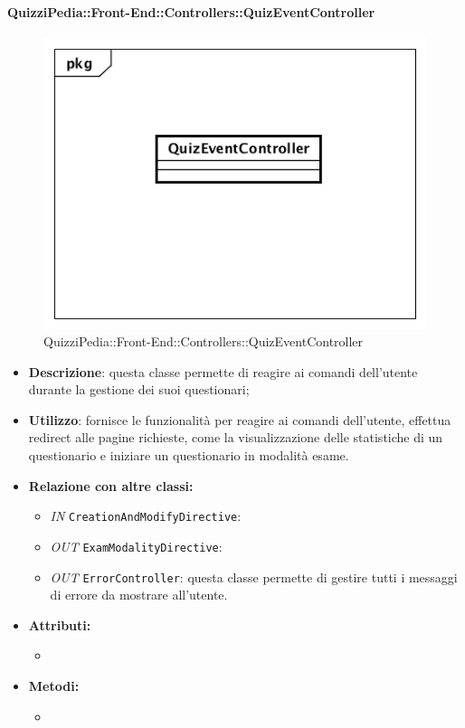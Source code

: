 \paragraph{QuizziPedia::Front-End::Controllers::QuizEventController}
\begin{figure}
	\centering
	\includegraphics[scale=0.45]{UML/Classi/Front-End/QuizziPedia_Front-end_Controller_QuizEventController.png}
	\caption{QuizziPedia::Front-End::Controllers::QuizEventController}
\end{figure}
\begin{itemize}
	\item \textbf{Descrizione}: questa classe permette di reagire ai comandi dell'utente durante la gestione dei suoi questionari;
	\item \textbf{Utilizzo}: fornisce le funzionalità per reagire ai comandi dell'utente, effettua redirect alle pagine richieste, come la visualizzazione delle statistiche di un questionario e iniziare un questionario in modalità esame.
	\item \textbf{Relazione con altre classi:}
	\begin{itemize}
		\item \textit{IN} \texttt{CreationAndModifyDirective}:  
		\item \textit{OUT} \texttt{ExamModalityDirective}:
		\item \textit{OUT} \texttt{ErrorController}: questa classe permette di gestire tutti i messaggi di errore da mostrare all'utente.
	\end{itemize}
	\item \textbf{Attributi:}
	\begin{itemize}
		\item 
	\end{itemize}
	\item \textbf{Metodi:}
	\begin{itemize}
		\item 
	\end{itemize}
\end{itemize}